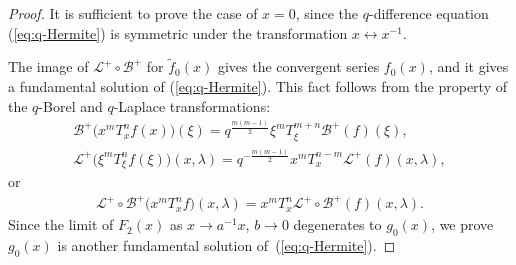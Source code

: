 \documentclass[pdftex]{sigma}
\numberwithin{equation}{section}
\theoremstyle{definition}
\begin{document}
\begin{proof}
It is sufficient to prove the case of $x=0$, since the $q$-difference equation (\ref{eq:q-Hermite}) is symmetric under the transformation $x\leftrightarrow x^{-1}$.

The image of $\mathcal{L}^{+}\circ\mathcal{B}^{+}$ for $\widetilde{f}_{0}(x)$ gives the convergent series $f_{0}(x)$, and it gives a fundamental solution of (\ref{eq:q-Hermite}).
This fact follows from the property of the $q$-Borel and $q$-Laplace transformations:
\begin{gather*}
\mathcal{B}^{+}\big(x^mT_x^nf(x)\big)(\xi)=q^\frac{m(m-1)}{2}\xi^mT_\xi^{m+n}\mathcal{B}^+(f)(\xi), \\
\mathcal{L}^{+}\big(\xi^mT_\xi^nf(\xi)\big)(x,\lambda)=q^{-\frac{m(m-1)}{2}}x^mT_x^{n-m}\mathcal{L}^+(f)(x,\lambda),
\end{gather*}
or
\begin{gather*}
\mathcal{L}^{+}\circ\mathcal{B}^{+}\big(x^mT_x^nf\big)(x,\lambda)=x^mT_x^n\mathcal{L}^+\circ\mathcal{B}^+(f)(x,\lambda).
\end{gather*}
Since the limit of $F_{2}(x)$ as $x\to a^{-1}x$, $b\to 0$ degenerates to $g_{0}(x)$, we prove $g_{0}(x)$ is another fundamental solution of~(\ref{eq:q-Hermite}).


\end{proof}
\end{document}

